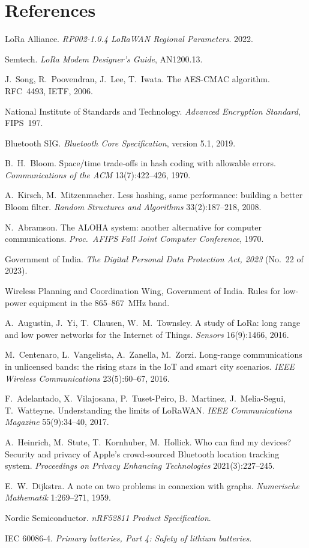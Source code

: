 \documentclass[11pt,a4paper,twoside,openany]{book}
\begin{document}
\chapter*{References}
\begin{enumerate}[leftmargin=2em,label={[\arabic*]},itemsep=3pt]\small
\item LoRa Alliance. \emph{RP002-1.0.4 LoRaWAN Regional Parameters}. 2022.
\item Semtech. \emph{LoRa Modem Designer's Guide}, AN1200.13.
\item J.~Song, R.~Poovendran, J.~Lee, T.~Iwata. The AES-CMAC algorithm. RFC~4493, IETF, 2006.
\item National Institute of Standards and Technology. \emph{Advanced Encryption Standard}, FIPS~197.
\item Bluetooth SIG. \emph{Bluetooth Core Specification}, version 5.1, 2019.
\item B.~H.~Bloom. Space/time trade-offs in hash coding with allowable errors. \emph{Communications of the ACM}
13(7):422--426, 1970.
\item A.~Kirsch, M.~Mitzenmacher. Less hashing, same performance: building a better Bloom filter. \emph{Random
Structures and Algorithms} 33(2):187--218, 2008.
\item N.~Abramson. The ALOHA system: another alternative for computer communications. \emph{Proc.\ AFIPS Fall Joint
Computer Conference}, 1970.
\item Government of India. \emph{The Digital Personal Data Protection Act, 2023} (No.~22 of 2023).
\item Wireless Planning and Coordination Wing, Government of India. Rules for low-power equipment in the 865--867~MHz
band.
\item A.~Augustin, J.~Yi, T.~Clausen, W.~M.~Townsley. A study of LoRa: long range and low power networks for the
Internet of Things. \emph{Sensors} 16(9):1466, 2016.
\item M.~Centenaro, L.~Vangelista, A.~Zanella, M.~Zorzi. Long-range communications in unlicensed bands: the rising
stars in the IoT and smart city scenarios. \emph{IEEE Wireless Communications} 23(5):60--67, 2016.
\item F.~Adelantado, X.~Vilajosana, P.~Tuset-Peiro, B.~Martinez, J.~Melia-Segui, T.~Watteyne. Understanding the
limits of LoRaWAN. \emph{IEEE Communications Magazine} 55(9):34--40, 2017.
\item A.~Heinrich, M.~Stute, T.~Kornhuber, M.~Hollick. Who can find my devices? Security and privacy of Apple's
crowd-sourced Bluetooth location tracking system. \emph{Proceedings on Privacy Enhancing Technologies} 2021(3):227--245.
\item E.~W.~Dijkstra. A note on two problems in connexion with graphs. \emph{Numerische Mathematik} 1:269--271, 1959.
\item Nordic Semiconductor. \emph{nRF52811 Product Specification}.
\item IEC 60086-4. \emph{Primary batteries, Part 4: Safety of lithium batteries}.
\end{enumerate}
\end{document}
